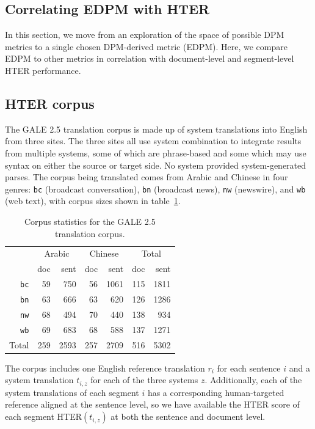 \documentclass{kluwer}    %
\begin{document}
\begin{article}
\section{Correlating EDPM with HTER}
\label{sec:hter1}
In this section, we move from an exploration of the space of possible
DPM metrics to a single chosen DPM-derived metric (EDPM).  Here, we
compare EDPM to other metrics in correlation with document-level and
segment-level HTER performance.

\subsection{HTER corpus}

The GALE 2.5 translation corpus is made up of system translations into
English from three sites.
The three sites all use system combination to integrate results from
multiple systems, some of which are phrase-based and some which may
use syntax on either the source or target side. No system provided
system-generated parses.
%
The corpus being translated comes from
Arabic and Chinese in four genres: \texttt{bc} (broadcast
conversation), \texttt{bn} (broadcast news), \texttt{nw} (newswire),
and \texttt{wb} (web text), with corpus sizes shown in
table~\ref{tab:galestats}.
\begin{table}
  \begin{tabular}{r|rr|rr|rr}
    \hline
     & \multicolumn{2}{c|}{Arabic} & \multicolumn{2}{c|}{Chinese}
     & \multicolumn{2}{c}{Total}\\
     & doc & sent & doc & sent & doc   & sent\\
     \hline
     \texttt{bc}    & 59  & 750 & 56 & 1061 & 115 & 1811\\
     \texttt{bn}    & 63  & 666 & 63 & 620  & 126 & 1286\\
     \texttt{nw}    & 68  & 494 & 70 & 440  & 138 & 934 \\
     \texttt{wb}    & 69  & 683 & 68 & 588  & 137 & 1271\\
     \hline
     Total & 259 & 2593& 257& 2709 & 516 & 5302\\
     \hline
  \end{tabular}
  \caption{Corpus statistics for the GALE 2.5 translation
    corpus.}
  \label{tab:galestats}
\end{table}
The corpus includes one English reference translation $r_i$
\cite{gale08phase2_5references} for each sentence $i$ and a system
translation $t_{i,z}$ for each of the three systems $z$. Additionally,
each of the system translations of each segment $i$ has a
corresponding human-targeted reference aligned at the sentence level,
so we have available the HTER score of each segment
HTER$(t_{i,z})$ at both the sentence and document level.


\end{article}
\end{document}
